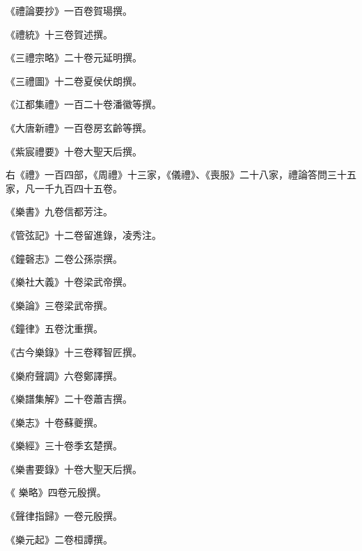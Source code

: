 \begin{pinyinscope}
 《禮論要抄》一百卷賀瑒撰。



 《禮統》十三卷賀述撰。



 《三禮宗略》二十卷元延明撰。



 《三禮圖》十二卷夏侯伏朗撰。



 《江都集禮》一百二十卷潘徽等撰。



 《大唐新禮》一百卷房玄齡等撰。



 《紫宸禮要》十卷大聖天后撰。



 右《禮》一百四部，《周禮》十三家，《儀禮》、《喪服》二十八家，禮論答問三十五家，凡一千九百四十五卷。



 《樂書》九卷信都芳注。



 《管弦記》十二卷留進錄，凌秀注。



 《鐘磬志》二卷公孫崇撰。



 《樂社大義》十卷梁武帝撰。



 《樂論》三卷梁武帝撰。



 《鐘律》五卷沈重撰。



 《古今樂錄》十三卷釋智匠撰。



 《樂府聲調》六卷鄭譯撰。



 《樂譜集解》二十卷蕭吉撰。



 《樂志》十卷蘇夔撰。



 《樂經》三十卷季玄楚撰。



 《樂書要錄》十卷大聖天后撰。



 《
 樂略》四卷元殷撰。



 《聲律指歸》一卷元殷撰。



 《樂元起》二卷桓譚撰。




\end{pinyinscope}

